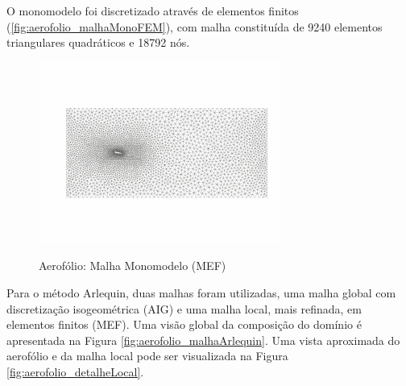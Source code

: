 O monomodelo foi discretizado através de elementos finitos (\autoref{fig:aerofolio_malhaMonoFEM}), com malha constituída de 9240 elementos triangulares quadráticos e 18792 nós. 

\begin{figure}[!htbp]
	\caption{Aerofólio: Malha Monomodelo (MEF)}
	\centering 
	{\includegraphics[scale=2.5,trim=0cm 0.9cm 0cm 0.8cm, clip=true]{Imagens/Cap6/aerofolio_malhaMonoFEM.pdf}}	
	\label{fig:aerofolio_malhaMonoFEM}
\end{figure}

Para o método Arlequin, duas malhas foram utilizadas, uma malha global com discretização isogeométrica (AIG) e uma malha local, mais refinada, em elementos finitos (MEF). Uma visão global da composição do domínio é apresentada na Figura \ref{fig:aerofolio_malhaArlequin}. Uma vista aproximada do aerofólio e da malha local pode ser visualizada na Figura \ref{fig:aerofolio_detalheLocal}.

